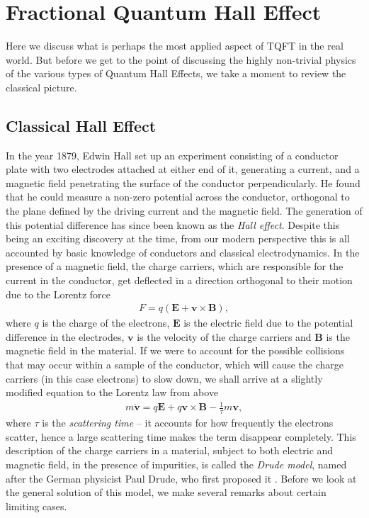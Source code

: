         \section{Fractional Quantum Hall Effect} \label{FQHE_sec}
        Here we discuss what is perhaps the most applied aspect of TQFT in the real world. But before we get to the point of discussing the highly non-trivial physics of the various types of Quantum Hall Effects, we take a moment to review the classical picture.
        \subsection{Classical Hall Effect}
        In the year 1879, Edwin Hall \cite{Hall1879} set up an experiment consisting of a conductor plate with two electrodes attached at either end of it, generating a current, and a magnetic field penetrating the surface of the conductor perpendicularly. He found that he could measure a non-zero potential across the conductor, orthogonal to the plane defined by the driving current and the magnetic field. The generation of this potential difference has since been known as the \textit{Hall effect}. Despite this being an exciting discovery at the time, from our modern perspective this is all accounted by basic knowledge of conductors and classical electrodynamics. In the presence of a magnetic field, the charge carriers, which are responsible for the current in the conductor, get deflected in a direction orthogonal to their motion due to the Lorentz force
        \begin{align}
            F = q(\bm{E} + \bm{v}\times \bm{B}),
        \end{align}
        where $q$ is the charge of the electrons, $\bm{E}$ is the electric field due to the potential difference in the electrodes, $\bm{v}$ is the velocity of the charge carriers and $\bm{B}$ is the magnetic field in the material. If we were to account for the possible collisions that may occur within a sample of the conductor, which will cause the charge carriers (in this case electrons) to slow down, we shall arrive at a slightly modified equation to the Lorentz law from above
        \begin{align}
            m \dot{\bm{v}} = q \bm{E}+q \bm{v}\times \bm{B} - \frac{1}{\tau} m \bm{v}, \label{eq:Drude_Model_Background}
        \end{align}
        where $\tau$ is the \textit{scattering time} -- it accounts for how frequently the electrons scatter, hence a large scattering time makes the term disappear completely. This description of the charge carriers in a material, subject to both electric and magnetic field, in the presence of impurities, is called the \textit{Drude model}, named after the German physicist Paul Drude, who first proposed it \cite{Drude1900a, Drude1900b}. Before we look at the general solution of this model, we make several remarks about certain limiting cases.\\
